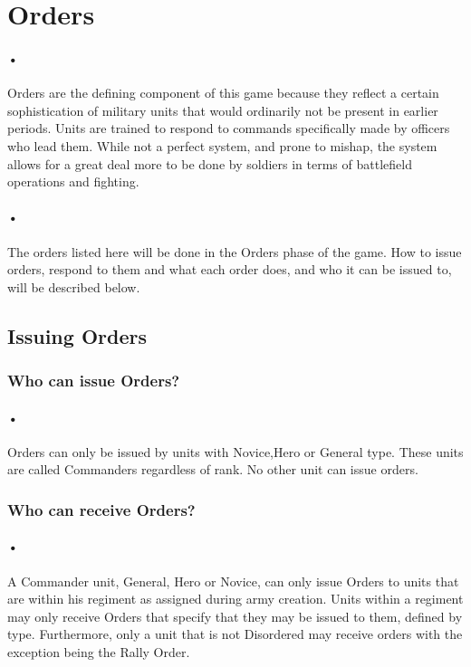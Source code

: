 \documentclass{article}
\begin{document}
\section{Orders}
\paragraph{•}
Orders are the defining component of this game because they reflect a certain sophistication of military units that would ordinarily not be present in earlier periods. Units are trained to respond to commands specifically made by officers who lead them. While not a perfect system, and prone to mishap, the system allows for a great deal more to be done by soldiers in terms of battlefield operations and fighting.

\paragraph{•}
The orders listed here will be done in the Orders phase of the game. How to issue orders, respond to them and what each order does, and who it can be issued to, will be described below.

\subsection{Issuing Orders}
\subsubsection{Who can issue Orders?}
\paragraph{•}
Orders can only be issued by units with Novice,Hero or General type. These units are called Commanders regardless of rank. No other unit can issue orders.
\subsubsection{Who can receive Orders?}
\paragraph{•}
A Commander unit, General, Hero or Novice, can only issue Orders to units that are within his regiment as assigned during army creation. Units within a regiment may only receive Orders that specify that they may be issued to them, defined by type. Furthermore, only a unit that is not Disordered may receive orders with the exception being the Rally Order.
\end{document}
